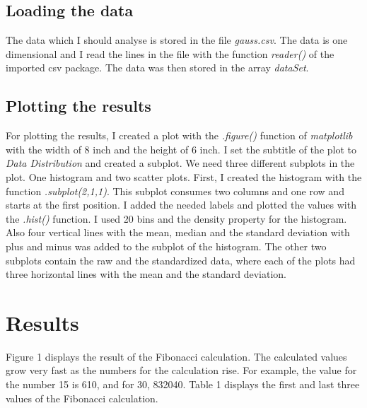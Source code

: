 \documentclass[10pt, a4paper, twocolumn]{article} %
\begin{document}
\subsection{Loading the data}
The data which I should analyse is stored in the file \textit{gauss.csv}. The data is one dimensional and I read the lines in the file with the function \textit{reader()} of the imported csv package. The data was then stored in the array \textit{dataSet}. 



\subsection{Plotting the results}
For plotting the results, I created a plot with the \textit{.figure()} function of \textit{matplotlib} with the width of 8 inch and the height of 6 inch. I set the subtitle of the plot to \textit{Data Distribution} and created a subplot. We need three different subplots in the plot. One histogram and two scatter plots. 
First, I created the histogram with the function  \textit{.subplot(2,1,1)}. This subplot consumes two columns and one row and starts at the first position. I added the needed labels and plotted the values with the \textit{.hist()} function. I used 20 bins and the density property for the histogram. Also four vertical lines with the mean, median and the standard deviation with plus and minus was added to the subplot of the histogram. 
The other two subplots contain the raw and the standardized data, where each of the plots had three horizontal lines with the mean and the standard deviation. 

\section{Results}
Figure 1 displays the result of the Fibonacci calculation. The calculated values grow very fast as the numbers for the calculation rise. For example, the value for the number 15 is 610, and for 30, 832040. Table 1 displays the first and last three values of the Fibonacci calculation.    
\end{document}
